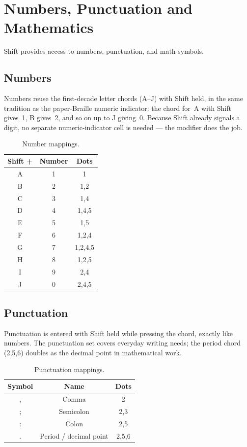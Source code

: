 \documentclass[11pt,a4paper,twoside]{article}
\begin{document}
\section{Numbers, Punctuation and Mathematics}

Shift provides access to numbers, punctuation, and math symbols.

\subsection{Numbers}
Numbers reuse the first-decade letter chords (A--J) with Shift held, in the
same tradition as the paper-Braille numeric indicator: the chord for~A
with Shift gives~1, B gives~2, and so on up to J giving~0. Because Shift
already signals a digit, no separate numeric-indicator cell is needed ---
the modifier does the job.

\begin{table}[H]\centering
\caption{Number mappings.}\label{tab:numbers}
\begin{tabular}{c c c}\toprule
\textbf{Shift +} & \textbf{Number} & \textbf{Dots} \\\midrule
A & 1 & 1 \\
B & 2 & 1,2 \\
C & 3 & 1,4 \\
D & 4 & 1,4,5 \\
E & 5 & 1,5 \\
F & 6 & 1,2,4 \\
G & 7 & 1,2,4,5 \\
H & 8 & 1,2,5 \\
I & 9 & 2,4 \\
J & 0 & 2,4,5 \\\bottomrule
\end{tabular}\end{table}

\subsection{Punctuation}
Punctuation is entered with Shift held while pressing the chord, exactly
like numbers. The punctuation set covers everyday writing needs; the
period chord (2,5,6) doubles as the decimal point in mathematical work.

\begin{table}[H]\centering
\caption{Punctuation mappings.}\label{tab:punctuation}
\begin{tabular}{c c c}\toprule
\textbf{Symbol} & \textbf{Name} & \textbf{Dots} \\\midrule
, & Comma & 2 \\
; & Semicolon & 2,3 \\
: & Colon & 2,5 \\
. & Period / decimal point & 2,5,6 \\\bottomrule
\end{tabular}\end{table}
\end{document}
